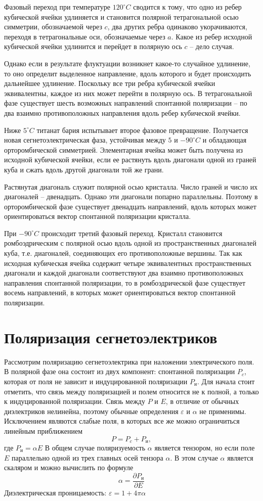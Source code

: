 \documentclass[12pt]{article}
\begin{document}
Фазовый переход при температуре $120 ^\circ C$ сводится к тому, что одно из ребер кубической ячейки удлиняется и становится полярной тетрагональной осью симметрии, обозначаемой через $c$, два других ребра одинаково укорачиваются, переходя в тетрагональные оси, обозначаемые через $a$. Какое из ребер исходной кубической ячейки удлинится и перейдет в полярную ось $c$ – дело случая. 

Однако если в результате флуктуации возникнет какое-то случайное удлинение, то оно определит выделенное направление, вдоль которого и будет происходить дальнейшее удлинение. Поскольку все три ребра кубической ячейки эквивалентны, каждое из них может перейти в полярную ось. В тетрагональной фазе существует шесть возможных направлений спонтанной поляризации – по два взаимно противоположных направления вдоль ребер кубической ячейки. 

Ниже $5^\circ C$ титанат бария испытывает второе фазовое превращение. Получается новая сегнетоэлектрическая фаза, устойчивая между $5$ и $-90^\circ C$ и обладающая орторомбической симметрией. Элементарная ячейка может быть получена из исходной кубической ячейки, если ее растянуть вдоль диагонали одной из граней куба и сжать вдоль другой диагонали той же грани. 

Растянутая диагональ служит полярной осью кристалла. Число граней и число их диагоналей – двенадцать. Однако эти диагонали попарно параллельны. Поэтому в орторомбической фазе существует двенадцать направлений, вдоль которых может ориентироваться вектор спонтанной поляризации кристалла. 

При $-90^\circ C$ происходит третий фазовый переход. Кристалл становится ромбоэдрическим с полярной осью вдоль одной из пространственных диагоналей куба, т.е. диагоналей, соединяющих его противоположные вершины. Так как исходная кубическая ячейка содержит четыре эквивалентных пространственных диагонали и каждой диагонали соответствуют два взаимно противоположных направления спонтанной поляризации, то в ромбоэдрической фазе существует восемь направлений, в которых может ориентироваться вектор спонтанной поляризации.

\section{Поляризация сегнетоэлектриков}
Рассмотрим поляризацию сегнетоэлектрика при наложении электрического поля. 
В полярной фазе она состоит из двух компонент: спонтанной поляризации $P_c$, которая от поля не зависит и индуцированной поляризации $P_\text{и}$.
Для начала стоит отметить, что связь между поляризацией и полем относится не к полной, а только к индуцированной поляризации. 
Связь между $P$ и $E$, в отличие от обычных диэлектриков нелинейна, поэтому обычные определения $\varepsilon$ и $\alpha$ не применимы. Исключением являются слабые поля, в которых все же можно ограничиться линейным приближением 
\[
P = P_c + P_\text{и}, 
\]
где $P_\text{и} = \alpha E$
В общем случае поляризуемость $\alpha$ является тензором, но если поле $E$ параллельно одной из трех главных осей тензора $\alpha$. В этом случае $\alpha$ является скаляром и можно вычислить по формуле 
\[
\alpha = \frac{\partial P_\text{и}}{\partial E}
\]
Диэлектрическая проницаемость: $\varepsilon = 1 + 4 \pi \alpha$
\end{document}
